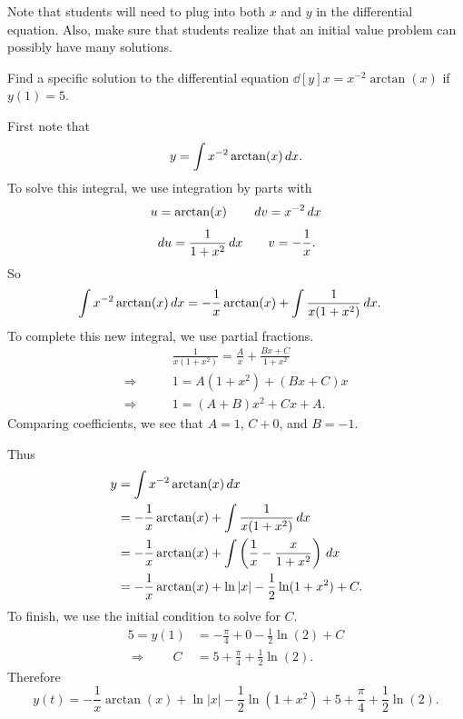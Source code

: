 \documentclass[]{ximera}
\begin{document}
\begin{instructorNotes}
Note that students will need to plug into both $x$ and $y$ in the differential equation.  
Also, make sure that students realize that an initial value problem can possibly have many solutions.
\end{instructorNotes}







\begin{problem}
Find a specific solution to the differential equation $\dd[y]{x} = x^{-2} \arctan(x)$ if $y(1)=5$.
	\begin{freeResponse}
	First note that
		\[
		y = \int x^{-2} \arctan(x) \,d x.
		\]
	To solve this integral, we use integration by parts with
		{\color{red}
		\[
		u = \arctan(x)  			\qquad 	\,d v = x^{-2} \,d x
		\]
		\[
		\,d u = \frac{1}{1+x^2} \,d x  \qquad 	v = -\frac{1}{x}.
		\]
		}
	So
		\begin{align*}
		\int x^{-2} \arctan(x) \,d x
		&= - \frac{1}{x} \arctan(x) + \int \frac{1}{x(1+x^2)} \,d x.
		\end{align*}
	To complete this new integral, we use partial fractions.
		{\color{red}
		\begin{align*}
		&\frac{1}{x(1+x^2)} = \frac{A}{x} + \frac{Bx+C}{1+x^2}  \\
		\Longrightarrow \qquad &1 = A(1+x^2) + (Bx+C)x  \\
		\Longrightarrow \qquad &1 = (A+B)x^2 + Cx + A.
		\end{align*}
	Comparing coefficients, we see that $A=1$, $C+0$, and $B = -1$.  
		}
		
	Thus
		\begin{align*}
		y &= \int x^{-2} \arctan(x) \,d x  \\
		&= - \frac{1}{x} \arctan(x) + \int \frac{1}{x(1+x^2)} \,d x  \\
		&= - \frac{1}{x} \arctan(x) + \int \left( \frac{1}{x} - \frac{x}{1+x^2} \right) \,d x  \\
		&= - \frac{1}{x} \arctan(x) + \ln|x| - \frac{1}{2} \ln(1+x^2) + C.
		\end{align*}
	To finish, we use the initial condition to solve for $C$.
		\begin{align*}
		5 = y(1) &= - \frac{\pi}{4} + 0 - \frac{1}{2} \ln(2) + C  \\
		\Longrightarrow \qquad C &= 5 + \frac{\pi}{4} + \frac{1}{2} \ln(2).
		\end{align*}
	Therefore
		\[
		y(t) = - \frac{1}{x} \arctan(x) + \ln|x| - \frac{1}{2} \ln(1+x^2) + 5 + \frac{\pi}{4} + \frac{1}{2} \ln(2).
		\]
	\end{freeResponse}

\end{problem}
\end{document}
